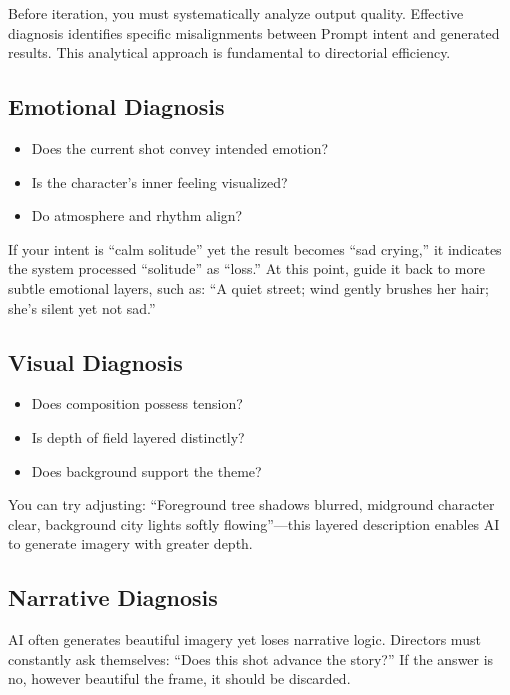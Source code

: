 Before iteration, you must systematically analyze output quality. Effective diagnosis identifies specific misalignments between Prompt intent and generated results. This analytical approach is fundamental to directorial efficiency.

\subsection{Emotional Diagnosis}

\begin{itemize}
\item Does the current shot convey intended emotion?
\item Is the character's inner feeling visualized?
\item Do atmosphere and rhythm align?
\end{itemize}

If your intent is ``calm solitude'' yet the result becomes ``sad crying,'' it indicates the system processed ``solitude'' as ``loss.'' At this point, guide it back to more subtle emotional layers, such as: ``A quiet street; wind gently brushes her hair; she's silent yet not sad.''

\subsection{Visual Diagnosis}

\begin{itemize}
\item Does composition possess tension?
\item Is depth of field layered distinctly?
\item Does background support the theme?
\end{itemize}

You can try adjusting: ``Foreground tree shadows blurred, midground character clear, background city lights softly flowing''—this layered description enables AI to generate imagery with greater depth.

\subsection{Narrative Diagnosis}

AI often generates beautiful imagery yet loses narrative logic. Directors must constantly ask themselves: ``Does this shot advance the story?'' If the answer is no, however beautiful the frame, it should be discarded.

